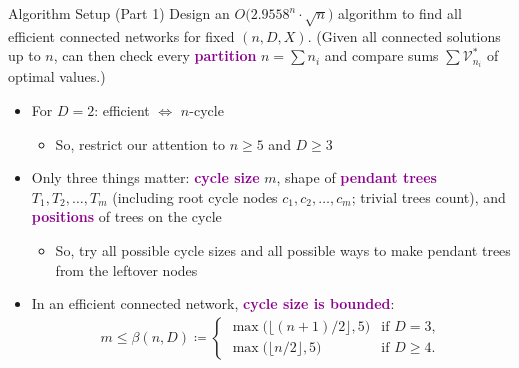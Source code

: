 \documentclass[xcolor=svgnames]{beamer}
\renewcommand{\emph}[1]{\textcolor{DarkMagenta}{\textbf{#1}}}
\def\V{\mathcal{V}}
\begin{document}
\begin{frame}{Algorithm Setup (Part 1)}
    Design an $O\bigl(2.9558^n \cdot \sqrt{n}\bigr)$ algorithm to find all efficient connected networks for fixed $(n, D, X)$. (Given all connected solutions up to $n$, can then check every \emph{partition} $n = \sum n_i$ and compare sums $\sum \V_{n_i}^*$ of optimal values.)\vfill
    \begin{itemize}
        \item For $D = 2$: efficient $\iff$ $n$-cycle\vfill
        \begin{itemize}
            \item So, restrict our attention to $n \ge 5$ and $D \ge 3$\vfill
        \end{itemize}
        \item Only three things matter: \emph{cycle size} $m$, shape of \emph{pendant trees} $T_1, T_2, \ldots, T_m$ (including root cycle nodes $c_1, c_2, \ldots, c_m$; trivial trees count), and \emph{positions} of trees on the cycle\vfill
        \begin{itemize}
            \item So, try all possible cycle sizes and all possible ways to make pendant trees from the leftover nodes\vfill
        \end{itemize}
        \item In an efficient connected network, \emph{cycle size is bounded}:
        \begin{align*}
            m \le \beta(n, D) \coloneqq \begin{cases}
                \max\bigl(\lfloor (n + 1) / 2 \rfloor, 5\bigr) & \text{if } D = 3, \\
                \max\bigl(\lfloor n / 2 \rfloor, 5\bigr) & \text{if } D \ge 4.
            \end{cases}
        \end{align*}
    \end{itemize}
\end{frame}
\end{document}
